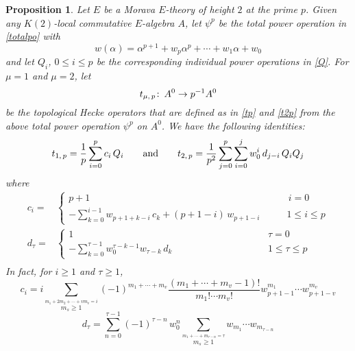 \documentclass{gtpart}
\newtheorem{prop}[thm]{Proposition}
\theoremstyle{definition}
\theoremstyle{remark}
\def\co{\colon\thinspace}
\newcommand{\ad}{{\rm and}}
\newcommand{\A}{\alpha}
\newcommand{\T}{\tau}
\renewcommand{\=}{\approx}
\renewcommand{\-}{\sim}
\numberwithin{equation}{section}
\numberwithin{thm}{section}
\begin{document}
\begin{prop}
 \label{prop:Q}
 Let $E$ be a Morava $E$-theory of height $2$ at the prime $p$.  
 Given any $K(2)$-local commutative $E$-algebra $A$, 
 let $\psi^p$ be the total power operation in \eqref{totalpo} with 
 \begin{equation}
  \label{wi}
  w(\A) = \A^{p + 1} + w_p \A^p + \cdots + w_1 \A + w_0 
 \end{equation}
 and let $Q_i$, $0 \leq i \leq p$ 
 be the corresponding individual power operations in \eqref{Q}.  
 For $\mu = 1$ and $\mu = 2$, let 
 \[
  t_{\mu,\,p} \co A^0 \to p^{-1} A^0 
 \]
 be the topological Hecke operators 
 that are defined as in \eqref{tp} and \eqref{t2p} 
 from the above total power operation $\psi^p$ on $A^0$.  
 We have the following identities: 
 \[
  t_{1,\,p} = \frac{1}{p} \sum_{i = 0}^p c_i \, Q_i \qquad \ad \qquad t_{2,\,p} = \frac{1}{p^2} \sum_{j = 0}^p \sum_{i = 0}^j w_0^i \, d_{j - i} \, Q_i Q_j 
 \]
 where 
 \begin{equation*}
  \begin{split}
   c_i = & \left\{\!\!
   \begin{array}{ll}
    p + 1 & \qquad\, i = 0 \\
    -\sum_{k = 0}^{i - 1} w_{p + 1 + k - i} \, c_k + (p + 1 - i) \, w_{p + 1 - i} & \qquad 1 \leq i \leq p 
   \end{array}
   \right.\\
   d_\T = & \left\{\!\!
   \begin{array}{ll}
    1 & \qquad\qquad\qquad\qquad\quad\, \T = 0 \\
    -\sum_{k = 0}^{\T - 1} w_0^{\T - k - 1} w_{\T - k} \, d_k & \qquad\qquad\qquad\qquad\quad\, 1 \leq \T \leq p 
   \end{array}
   \right.\\
  \end{split}
 \end{equation*}
 In fact, for $i \geq 1$ and $\T \geq 1$, 
 \[
  c_i = i \sum_{\stackrel{\scriptstyle m_1 + 2 m_2 + \cdots + v m_v = i}{m_s \geq 1}} (-1)^{m_1 + \cdots + m_v} 
  \frac{(m_1 + \cdots + m_v - 1)!}{m_1! \cdots m_v!} w_{p + 1 - 1}^{m_1} \cdots w_{p + 1 - v}^{m_v} 
 \]
 \begin{equation}
  \label{d_t}
  d_\T = \sum_{n = 0}^{\T - 1} (-1)^{\T - n} \, w_0^n \sum_{\stackrel{\scriptstyle m_1 + \cdots + m_{\T - n} = \T}{m_s \geq 1}} w_{m_1} \cdots w_{m_{\T - n}} 
 \end{equation}
\end{prop}
\end{document}
